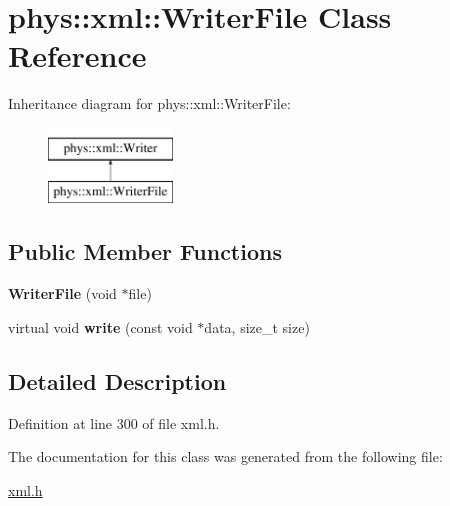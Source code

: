 \hypertarget{classphys_1_1xml_1_1WriterFile}{
\section{phys::xml::WriterFile Class Reference}
\label{dc/d53/classphys_1_1xml_1_1WriterFile}
}
Inheritance diagram for phys::xml::WriterFile:\begin{figure}[H]
\begin{center}
\leavevmode
\includegraphics[height=2.000000cm]{dc/d53/classphys_1_1xml_1_1WriterFile}
\end{center}
\end{figure}
\subsection*{Public Member Functions}
\begin{DoxyCompactItemize}
\item 
\hypertarget{classphys_1_1xml_1_1WriterFile_aba665d4dc17c956798a80cb4e8c2774d}{
{\bfseries WriterFile} (void $\ast$file)}
\label{dc/d53/classphys_1_1xml_1_1WriterFile_aba665d4dc17c956798a80cb4e8c2774d}

\item 
\hypertarget{classphys_1_1xml_1_1WriterFile_a39c3b3dba5c220430a616e208ef18880}{
virtual void {\bfseries write} (const void $\ast$data, size\_\-t size)}
\label{dc/d53/classphys_1_1xml_1_1WriterFile_a39c3b3dba5c220430a616e208ef18880}

\end{DoxyCompactItemize}


\subsection{Detailed Description}


Definition at line 300 of file xml.h.



The documentation for this class was generated from the following file:\begin{DoxyCompactItemize}
\item 
\hyperlink{xml_8h}{xml.h}\end{DoxyCompactItemize}
